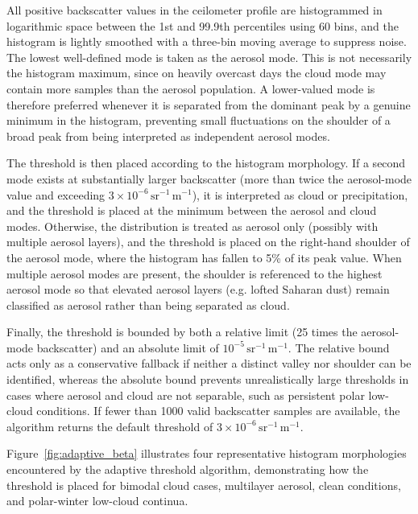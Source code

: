\documentclass[11pt,a4paper]{article}
\begin{document}
All positive backscatter values in the ceilometer profile are
histogrammed in logarithmic space between the 1st and 99.9th
percentiles using 60 bins, and the histogram is lightly smoothed with
a three-bin moving average to suppress noise. The lowest well-defined
mode is taken as the aerosol mode. This is not necessarily the
histogram maximum, since on heavily overcast days the cloud mode may
contain more samples than the aerosol population. A lower-valued mode
is therefore preferred whenever it is separated from the dominant peak
by a genuine minimum in the histogram, preventing small fluctuations
on the shoulder of a broad peak from being interpreted as independent
aerosol modes.

The threshold is then placed according to the histogram morphology. If
a second mode exists at substantially larger backscatter (more than
twice the aerosol-mode value and exceeding
$3\times10^{-6}\,\mathrm{sr^{-1}\,m^{-1}}$), it is interpreted as
cloud or precipitation, and the threshold is placed at the minimum
between the aerosol and cloud modes. Otherwise, the distribution is
treated as aerosol only (possibly with multiple aerosol layers), and
the threshold is placed on the right-hand shoulder of the aerosol
mode, where the histogram has fallen to 5\% of its peak value. When
multiple aerosol modes are present, the shoulder is referenced to the
highest aerosol mode so that elevated aerosol layers (e.g. lofted
Saharan dust) remain classified as aerosol rather than being separated
as cloud.

Finally, the threshold is bounded by both a relative limit (25 times
the aerosol-mode backscatter) and an absolute limit of
$10^{-5}\,\mathrm{sr^{-1}\,m^{-1}}$. The relative bound acts only as a
conservative fallback if neither a distinct valley nor shoulder can be
identified, whereas the absolute bound prevents unrealistically large
thresholds in cases where aerosol and cloud are not separable, such as
persistent polar low-cloud conditions. If fewer than 1000 valid
backscatter samples are available, the algorithm returns the default
threshold of $3\times10^{-6}\,\mathrm{sr^{-1}\,m^{-1}}$.

Figure~\ref{fig:adaptive_beta} illustrates four representative
histogram morphologies encountered by the adaptive threshold
algorithm, demonstrating how the threshold is placed for bimodal cloud
cases, multilayer aerosol, clean conditions, and polar-winter
low-cloud continua.
\end{document}
